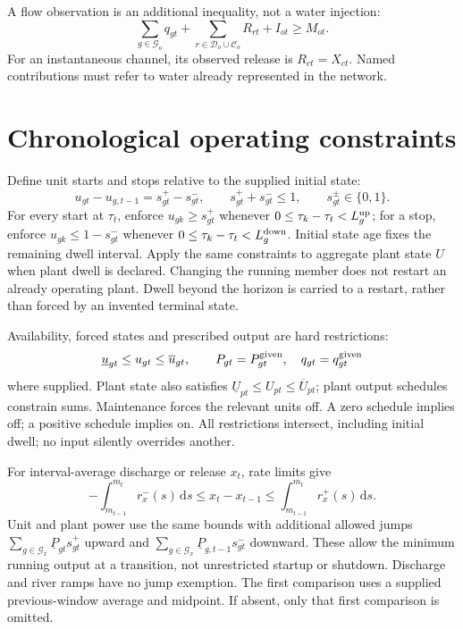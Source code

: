 \documentclass[10pt,a4paper]{article}
\newcommand{\dd}{\,\mathrm{d}}
\begin{document}
A flow observation is an additional inequality, not a water injection:
\begin{equation}
\sum_{g\in\mathcal G_o}q_{gt}
+\sum_{r\in\mathcal D_o\cup\mathcal C_o}R_{rt}+I_{ot}
\ge M_{ot}.
\label{eq:observation}
\end{equation}
For an instantaneous channel, its observed release is $R_{ct}=X_{ct}$.
Named contributions must refer to water already represented in the network.

\section{Chronological operating constraints}

Define unit starts and stops relative to the supplied initial state:
\begin{equation}
u_{gt}-u_{g,t-1}=s^+_{gt}-s^-_{gt},\qquad
s^+_{gt}+s^-_{gt}\le1,\qquad s^\pm_{gt}\in\{0,1\}.
\label{eq:transitions}
\end{equation}
For every start at $\tau_t$, enforce $u_{gk}\ge s^+_{gt}$ whenever
$0\le\tau_k-\tau_t<L_g^{\rm up}$; for a stop, enforce
$u_{gk}\le1-s^-_{gt}$ whenever
$0\le\tau_k-\tau_t<L_g^{\rm down}$.
Initial state age fixes the remaining dwell interval.
Apply the same constraints to aggregate plant state $U$ when plant dwell
is declared. Changing the running member does not restart an already
operating plant. Dwell beyond the horizon is carried to a restart, rather
than forced by an invented terminal state.

Availability, forced states and prescribed output are hard restrictions:
\begin{equation}
\underline u_{gt}\le u_{gt}\le\overline u_{gt},\qquad
P_{gt}=P_{gt}^{\rm given},\quad q_{gt}=q_{gt}^{\rm given}
\label{eq:schedules}
\end{equation}
where supplied. Plant state also satisfies
$\underline U_{pt}\le U_{pt}\le\overline U_{pt}$;
plant output schedules constrain sums.
Maintenance forces the relevant units off. A zero schedule implies off;
a positive schedule implies on. All restrictions intersect, including
initial dwell; no input silently overrides another.

For interval-average discharge or release $x_t$, rate limits give
\begin{equation}
-\int_{m_{t-1}}^{m_t}r_x^-(s)\dd s
\le x_t-x_{t-1}\le
\int_{m_{t-1}}^{m_t}r_x^+(s)\dd s.
\label{eq:ramps}
\end{equation}
Unit and plant power use the same bounds with additional allowed jumps
$\sum_{g\in\mathcal G_x}\underline P_{gt}s^+_{gt}$ upward and
$\sum_{g\in\mathcal G_x}\underline P_{g,t-1}s^-_{gt}$ downward.
These allow the minimum running output at a transition, not unrestricted
startup or shutdown. Discharge and river ramps have no jump exemption.
The first comparison uses a supplied previous-window average and midpoint.
If absent, only that first comparison is omitted.
\end{document}
